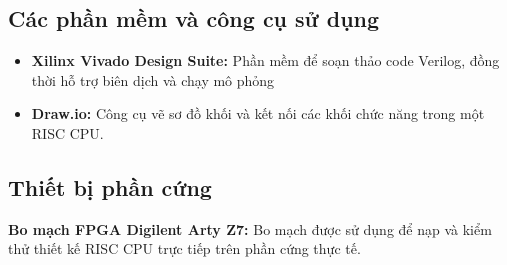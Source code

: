 




\subsection{Các phần mềm và công cụ sử dụng}
\begin{itemize}
    \item \textbf{Xilinx Vivado Design Suite:} Phần mềm để soạn thảo code Verilog, đồng thời hỗ trợ biên dịch và chạy mô phỏng
    \item \textbf{Draw.io: } Công cụ vẽ sơ đồ khối và kết nối các khối chức năng trong một RISC CPU.
\end{itemize}

\subsection{Thiết bị phần cứng}
\textbf{Bo mạch FPGA Digilent Arty Z7: }Bo mạch được sử dụng để nạp và kiểm thử thiết kế RISC CPU trực tiếp trên phần cứng thực tế.

